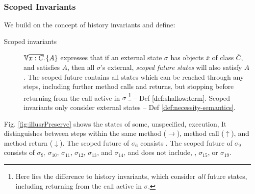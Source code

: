 \subsubsection{Scoped Invariants}

\label{sect:approach:scoped}
We build on the concept of history invariants \cite{liskov94behavioral,usinghistory,Cohen10} and define:

\begin{description}
\item[{Scoped invariants}]  
{$\TwoStatesN  {\overline{x:C}}  {A}$} expresses that if an external {state} $\sigma$ 
 has objects $\overline x$ of class $\overline C$, and satisfies $A$, then all $\sigma$'s  {external}, \emph{scoped  future  states}   will  {also} satisfy  {$A$}. 
The scoped future contains all  states which can be reached through any steps, including further method calls and returns, but stopping before returning  from the call active in $\sigma$ \footnote{{Here lies the difference to history invariants, which consider \emph{all} future states, including returning from the call active in $\sigma$.}}  --  \cf Def  \ref{def:shallow:term}.
Scoped invariants only consider external states -- \cf Def \ref{def:necessity-semantics}.
\end{description}

 Fig. \ref{fig:illusrPreserve} shows the  states of some, unspecified, execution,  
It distinguishes between steps within the same method ($\rightarrow$),
method call ($\uparrow$), and method return ($\downarrow$). %
The scoped future of $\sigma_6$ consists . The scoped future of $\sigma_9$ consists of $\sigma_9$, $\sigma_{10}$,  $\sigma_{11}$,  
$\sigma_{12}$,   $\sigma_{13}$,  and $\sigma_{14}$, and does not include, \eg,  $\sigma_{15}$, or $\sigma_{19}$.
 
